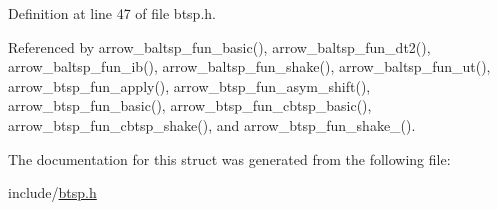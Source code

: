 Definition at line 47 of file btsp.h.

Referenced by arrow\_\-baltsp\_\-fun\_\-basic(), arrow\_\-baltsp\_\-fun\_\-dt2(), arrow\_\-baltsp\_\-fun\_\-ib(), arrow\_\-baltsp\_\-fun\_\-shake(), arrow\_\-baltsp\_\-fun\_\-ut(), arrow\_\-btsp\_\-fun\_\-apply(), arrow\_\-btsp\_\-fun\_\-asym\_\-shift(), arrow\_\-btsp\_\-fun\_\-basic(), arrow\_\-btsp\_\-fun\_\-cbtsp\_\-basic(), arrow\_\-btsp\_\-fun\_\-cbtsp\_\-shake(), and arrow\_\-btsp\_\-fun\_\-shake\_().

The documentation for this struct was generated from the following file:\begin{CompactItemize}
\item 
include/\hyperlink{btsp_8h}{btsp.h}\end{CompactItemize}
